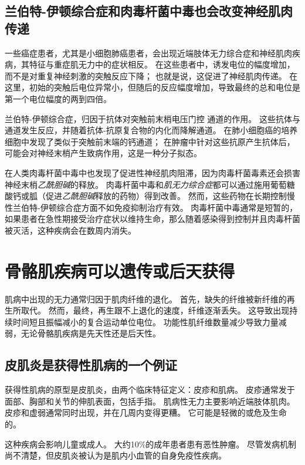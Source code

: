 \subsection{兰伯特-伊顿综合症和肉毒杆菌中毒也会改变神经肌肉传递}

一些癌症患者，尤其是小细胞肺癌患者，会出现近端肢体无力综合症和神经肌肉疾病，其特征与重症肌无力中的症状相反。
在这些患者中，诱发电位的幅度增加，而不是对重复神经刺激的突触反应下降；
也就是说，这促进了神经肌肉传递。
在这里，初始的突触后电位异常小，但随后的反应幅度增加，导致最终的总和电位是第一个电位幅度的两到四倍。


兰伯特-伊顿综合症，归因于抗体对突触前末梢电压门控  通道的作用。
这些抗体与通道发生反应，并随着抗体-抗原复合物的内化而降解通道。
在肺小细胞癌的培养细胞中发现了类似于突触前末端的钙通道；
在肿瘤中针对这些抗原产生抗体后，可能会对神经末梢产生致病作用，这是一种分子拟态。


在人类肉毒杆菌中毒中也发现了促进性神经肌肉阻滞，因为肉毒杆菌毒素还会损害神经末梢\textit{乙酰胆碱}的释放。
肉毒杆菌中毒和\textit{肌无力综合症}都可以通过施用葡萄糖酸钙或胍（促进\textit{乙酰胆碱}释放的药物）得到改善。
然而，这些药物在长期控制慢性兰伯特-伊顿综合症方面不如免疫抑制治疗有效。
肉毒杆菌中毒通常是短暂的，如果患者在急性期接受治疗症状以维持生命，那么随着感染得到控制并且肉毒杆菌被灭活，这种疾病会在数周内消失。



\section{骨骼肌疾病可以遗传或后天获得}

肌病中出现的无力通常归因于肌肉纤维的退化。
首先，缺失的纤维被新纤维的再生所取代。
然而，最终，再生跟不上退化的速度，纤维逐渐丢失。
这导致出现持续时间短且振幅减小的复合运动单位电位。
功能性肌纤维数量减少导致力量减弱，无论骨骼肌疾病是先天性还是后天性。



\subsection{皮肌炎是获得性肌病的一个例证}

获得性肌病的原型是皮肌炎，由两个临床特征定义：皮疹和肌病。
皮疹通常发于面部、胸部和关节的伸肌表面，包括手指。
肌病性无力主要影响近端肢体肌肉。
皮疹和虚弱通常同时出现，并在几周内变得更糟。
它可能是轻微的或危及生命的。


这种疾病会影响儿童或成人。
大约10\%的成年患者患有恶性肿瘤。
尽管发病机制尚不清楚，但皮肌炎被认为是肌内小血管的自身免疫性疾病。



